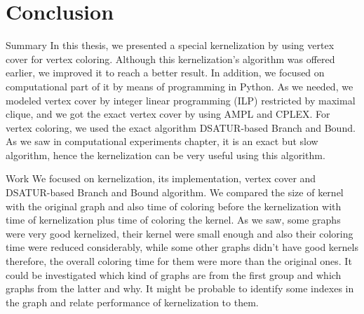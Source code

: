 \documentclass{beamer}
\begin{document}
\section{Conclusion}

\begin{frame}{Summary}
In this thesis, we presented a special kernelization by using vertex cover for vertex coloring. Although this kernelization's algorithm was offered earlier, we improved it to reach a better result. In addition, we focused on computational part of it by means of programming in Python. As we needed, we modeled vertex cover by integer linear programming (ILP) restricted by maximal clique, and we got the exact vertex cover by using AMPL and CPLEX. For vertex coloring, we used the exact algorithm DSATUR-based Branch and Bound. As we saw in computational experiments chapter, it is an exact but slow algorithm, hence the kernelization can be very useful using this algorithm. 
\end{frame}
\begin{frame}{Work}
We focused on kernelization, its implementation, vertex cover and DSATUR-based Branch and Bound algorithm. We compared the size of kernel with the original graph and also time of coloring before the kernelization with time of kernelization plus time of coloring the kernel. As we saw, some graphs were very good kernelized, their kernel were small enough and also their coloring time were reduced considerably, while some other graphs didn't have good kernels therefore, the overall coloring time for them were more than the original ones. It could be investigated which kind of graphs are from the first group and which graphs from the latter and why. It might be probable to identify some indexes in the graph and relate performance of kernelization to them.

\end{frame}
\end{document}

